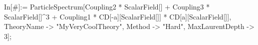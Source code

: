 In[\#]:= ParticleSpectrum[Coupling2 * ScalarField[] + Coupling3 * ScalarField[]^3 + Coupling1 * CD[-a][ScalarField[]] * CD[a][ScalarField[]], TheoryName -> "MyVeryCoolTheory", Method -> "Hard", MaxLaurentDepth -> 3]; 